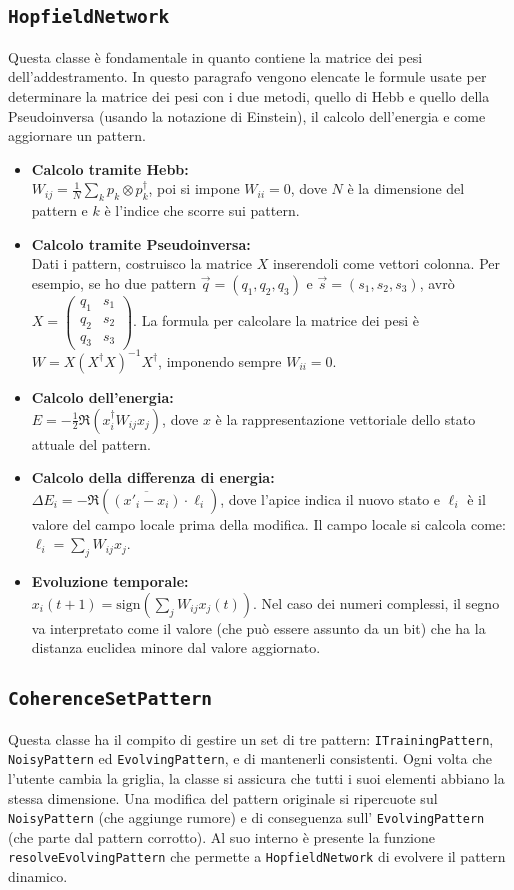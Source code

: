 \documentclass{article}
\begin{document}
\subsection{\texttt{HopfieldNetwork}}
Questa classe è fondamentale in quanto contiene la matrice dei pesi dell'addestramento. In questo paragrafo vengono elencate le formule usate per determinare la matrice dei pesi con i due metodi, quello di Hebb e quello della Pseudoinversa (usando la notazione di Einstein), il calcolo dell'energia e come aggiornare un pattern.
\begin{itemize}
\item
\textbf{Calcolo tramite Hebb:}
\\
$W_{ij}=\frac{1}{N}\sum_k p_k\otimes p_k^{\dagger}$, poi si impone $W_{ii}=0$, dove $N$ è la dimensione del pattern e $k$ è l'indice che scorre sui pattern.
\item
\textbf{Calcolo tramite Pseudoinversa:}
\\
Dati i pattern, costruisco la matrice $X$ inserendoli come vettori colonna. Per esempio, se ho due pattern $\vec{q}=(q_1,q_2,q_3)$ e $\vec{s}=(s_1,s_2,s_3)$, avrò $X=\begin{pmatrix} q_1 & s_1 \\q_2 & s_2 \\q_3 & s_3  \end{pmatrix}$.
La formula per calcolare la matrice dei pesi è 
\\
$W=X(X^{\dagger}X)^{-1}X^{\dagger}$, imponendo sempre $W_{ii}=0$.
\item
\textbf{Calcolo dell'energia:}
\\
$E=-\frac{1}{2} \Re(x_i^{\dagger}W_{ij}x_j)$, dove $x$ è la rappresentazione vettoriale dello stato attuale del pattern.
\item 
\textbf{Calcolo della differenza di energia:}
\\
$\Delta E_i = - \Re(\overline{(x'_i - x_i)} \cdot \ell_i)$, dove l'apice indica il nuovo stato e $\ell_i$ è il valore del campo locale prima della modifica. Il campo locale si calcola come: $\ell_i = \sum_j W_{ij} x_j$.
\item
\textbf{Evoluzione temporale:}
\\
$x_i(t+1)=\text{sign} \left(\sum_j W_{ij}x_j(t)\right)$.
Nel caso dei numeri complessi, il segno va interpretato come il valore (che può essere assunto da un bit) che ha la distanza euclidea minore dal valore aggiornato.
\end{itemize}
\subsection{\texttt{CoherenceSetPattern}}
Questa classe ha il compito di gestire un set di tre pattern: \texttt{ITrainingPattern}, \texttt{NoisyPattern} ed \texttt{EvolvingPattern}, e di mantenerli consistenti. Ogni volta che l'utente cambia la griglia, la classe si assicura che tutti i suoi elementi abbiano la stessa dimensione. Una modifica del pattern originale si ripercuote sul \texttt{NoisyPattern} (che aggiunge rumore) e di conseguenza sull' \texttt{EvolvingPattern} (che parte dal pattern corrotto). Al suo interno è presente la funzione \texttt{resolveEvolvingPattern} che permette a \texttt{HopfieldNetwork} di evolvere il pattern dinamico.
\end{document}
